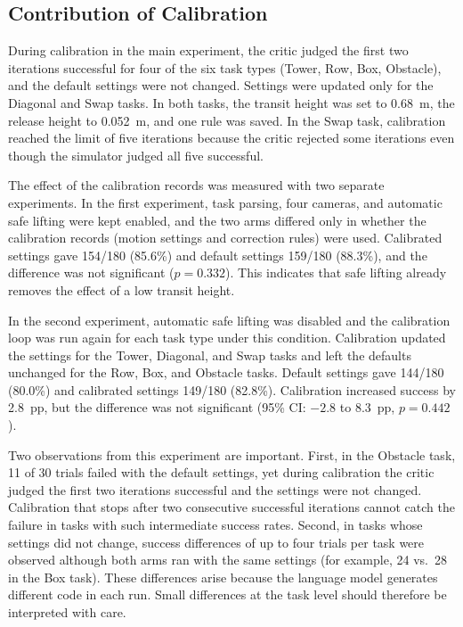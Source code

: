 \documentclass[preprint,12pt]{elsarticle}
\begin{document}
\subsection{Contribution of Calibration}
\label{sec:calib}

During calibration in the main experiment, the critic judged the first two iterations successful for four of the six task types (Tower, Row, Box, Obstacle), and the default settings were not changed. Settings were updated only for the Diagonal and Swap tasks. In both tasks, the transit height was set to 0.68~m, the release height to 0.052~m, and one rule was saved. In the Swap task, calibration reached the limit of five iterations because the critic rejected some iterations even though the simulator judged all five successful.

The effect of the calibration records was measured with two separate experiments. In the first experiment, task parsing, four cameras, and automatic safe lifting were kept enabled, and the two arms differed only in whether the calibration records (motion settings and correction rules) were used. Calibrated settings gave 154/180 (85.6\%) and default settings 159/180 (88.3\%), and the difference was not significant ($p = 0.332$). This indicates that safe lifting already removes the effect of a low transit height.

In the second experiment, automatic safe lifting was disabled and the calibration loop was run again for each task type under this condition. Calibration updated the settings for the Tower, Diagonal, and Swap tasks and left the defaults unchanged for the Row, Box, and Obstacle tasks. Default settings gave 144/180 (80.0\%) and calibrated settings 149/180 (82.8\%). Calibration increased success by 2.8~pp, but the difference was not significant (95\% CI: $-2.8$ to 8.3~pp, $p = 0.442$).

Two observations from this experiment are important. First, in the Obstacle task, 11 of 30 trials failed with the default settings, yet during calibration the critic judged the first two iterations successful and the settings were not changed. Calibration that stops after two consecutive successful iterations cannot catch the failure in tasks with such intermediate success rates. Second, in tasks whose settings did not change, success differences of up to four trials per task were observed although both arms ran with the same settings (for example, 24 vs.\ 28 in the Box task). These differences arise because the language model generates different code in each run. Small differences at the task level should therefore be interpreted with care.
\end{document}
